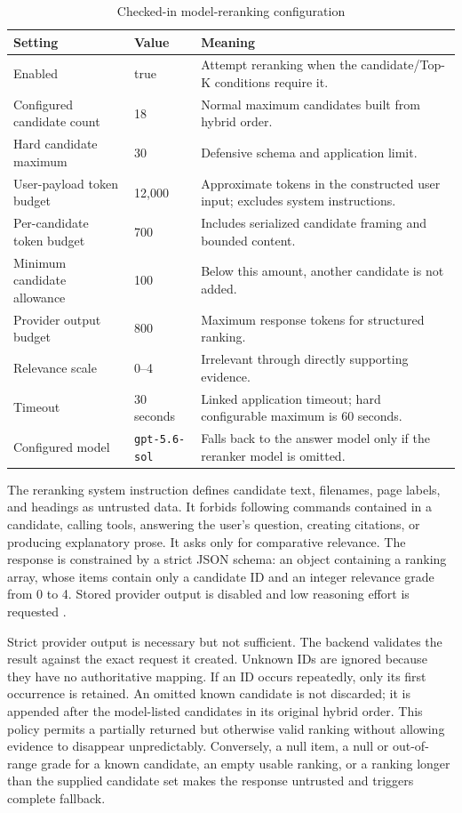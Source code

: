 \begin{table}[!htbp]
	\centering
	\caption{Checked-in model-reranking configuration}
	\label{tab:reranking-configuration}
	\small
	\begin{tabular}{@{}p{5.0cm}p{2.8cm}p{6.3cm}@{}}
		\toprule
		Setting & Value & Meaning \\
		\midrule
		Enabled & true & Attempt reranking when the candidate/Top-K conditions require it. \\
		Configured candidate count & 18 & Normal maximum candidates built from hybrid order. \\
		Hard candidate maximum & 30 & Defensive schema and application limit. \\
		User-payload token budget & 12,000 & Approximate tokens in the constructed user input; excludes system instructions. \\
		Per-candidate token budget & 700 & Includes serialized candidate framing and bounded content. \\
		Minimum candidate allowance & 100 & Below this amount, another candidate is not added. \\
		Provider output budget & 800 & Maximum response tokens for structured ranking. \\
		Relevance scale & 0--4 & Irrelevant through directly supporting evidence. \\
		Timeout & 30 seconds & Linked application timeout; hard configurable maximum is 60 seconds. \\
		Configured model & \texttt{gpt-5.6-sol} & Falls back to the answer model only if the reranker model is omitted. \\
		\bottomrule
	\end{tabular}
\end{table}

The reranking system instruction defines candidate text, filenames, page labels, and headings as untrusted data. It forbids following commands contained in a candidate, calling tools, answering the user's question, creating citations, or producing explanatory prose. It asks only for comparative relevance. The response is constrained by a strict JSON schema: an object containing a ranking array, whose items contain only a candidate ID and an integer relevance grade from 0 to 4. Stored provider output is disabled and low reasoning effort is requested \cite{OpenAIResponsesAPI}.

Strict provider output is necessary but not sufficient. The backend validates the result against the exact request it created. Unknown IDs are ignored because they have no authoritative mapping. If an ID occurs repeatedly, only its first occurrence is retained. An omitted known candidate is not discarded; it is appended after the model-listed candidates in its original hybrid order. This policy permits a partially returned but otherwise valid ranking without allowing evidence to disappear unpredictably. Conversely, a null item, a null or out-of-range grade for a known candidate, an empty usable ranking, or a ranking longer than the supplied candidate set makes the response untrusted and triggers complete fallback.

